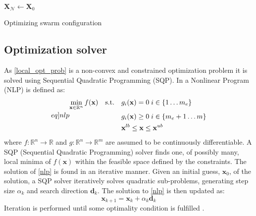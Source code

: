\begin{algorithm}[H]
  \SetAlgoLined

  $\mathbf{X}_{\mathcal{N}}\gets \mathbf{X}_{0}$\;
   \caption{Optimizing swarm configuration}
   \label{alg:alg1}
  \end{algorithm}
\subsection{Optimization solver}
As \eqref{local_opt_prob} is a non-convex and constrained optimization problem it is solved using Sequential Quadratic Programming (SQP). 
In \cite{kraft1988software} a Nonlinear Program (NLP) is defined as:
\begin{equation}\label[eq]{nlp}
  \begin{split}
    \min_{\mathbf{x}\in\mathbb{R}^{n}}f(\mathbf{x})\quad\mathrm{s.t.}\quad&g_{i}(\mathbf{x}) = 0\;i\in\{1\hdots m_{e}\}\\
    &g_{i}(\mathbf{x}) \geq 0\;i\in\{m_{e}+1\hdots m\}\\
    &\mathbf{x}^{lb}\leq\mathbf{x}\leq\mathbf{x}^{ub}
  \end{split}
\end{equation}
where $f:\mathbb{R}^{n}\rightarrow\mathbb{R}$ and $g:\mathbb{R}^{n}\rightarrow\mathbb{R}^{m}$ are assumed to be continuously differentiable. A SQP (Sequential Quadratic Programming) solver finds one, 
of possibly many, local minima of $f(\mathbf{x})$ within the feasible space defined by the constraints. The solution
of \eqref{nlp} is found in an iterative manner. Given an initial guess, $\mathbf{x}_{0}$, of the solution, a SQP solver iteratively solves quadratic sub-problems, generating step size $\alpha_{k}$ and search 
direction $\mathbf{d}_{k}$. The solution to \eqref{nlp} is then updated as:
\begin{equation}
  \mathbf{x}_{k+1} = \mathbf{x}_{k} + \alpha_{k}\mathbf{d}_{k}
\end{equation}
Iteration is performed until some optimality condition is fulfilled \cite{kraft1988software}.

